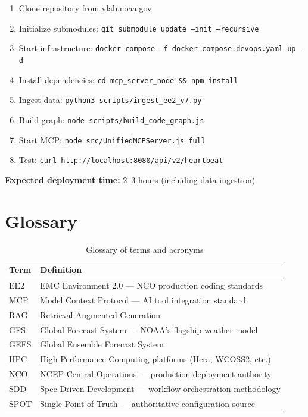 \documentclass[11pt,letterpaper,twoside]{article}
\begin{document}
\begin{enumerate}[leftmargin=2em]
    \item Clone repository from vlab.noaa.gov
    \item Initialize submodules: \texttt{git submodule update --init --recursive}
    \item Start infrastructure: \texttt{docker compose -f docker-compose.devops.yaml up -d}
    \item Install dependencies: \texttt{cd mcp\_server\_node \&\& npm install}
    \item Ingest data: \texttt{python3 scripts/ingest\_ee2\_v7.py}
    \item Build graph: \texttt{node scripts/build\_code\_graph.js}
    \item Start MCP: \texttt{node src/UnifiedMCPServer.js full}
    \item Test: \texttt{curl http://localhost:8080/api/v2/heartbeat}
\end{enumerate}

\begin{keyinsight}
\textbf{Expected deployment time:} 2--3 hours (including data ingestion)
\end{keyinsight}

\appendix
\newpage

\section{Glossary}

\begin{table}[H]
\centering
\renewcommand{\arraystretch}{1.3}
\begin{tabularx}{\textwidth}{l|X}
\toprule
\textbf{Term} & \textbf{Definition} \\
\midrule
EE2 & EMC Environment 2.0 — NCO production coding standards \\
MCP & Model Context Protocol — AI tool integration standard \\
RAG & Retrieval-Augmented Generation \\
GFS & Global Forecast System — NOAA's flagship weather model \\
GEFS & Global Ensemble Forecast System \\
HPC & High-Performance Computing platforms (Hera, WCOSS2, etc.) \\
NCO & NCEP Central Operations — production deployment authority \\
SDD & Spec-Driven Development — workflow orchestration methodology \\
SPOT & Single Point of Truth — authoritative configuration source \\
\bottomrule
\end{tabularx}
\caption{Glossary of terms and acronyms}
\end{table}
\end{document}
